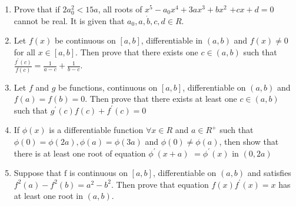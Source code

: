 \begin{enumerate}
    \item Prove that if $2 a_0^2<15 a$, all roots of $x^5-a_0 x^4+3 a x^3+b x^2$ $+c x+d=0$ cannot be real. It is given that $a_0, a, \dot{b}, c, d \in R$.
\item Let $f(x)$ be continuous on $[a, b]$, differentiable in $(a, b)$ and $f(x) \neq 0$ for all $x \in[a, b]$. Then prove that there exists one $c \in(a, b)$ such that $\frac{f^{\prime}(c)}{f(c)}=\frac{1}{a-c}+\frac{1}{b-c}$.

\item  Let $f$ and $g$ be functions, continuous on $[a, b]$, differentiable on $(a, b)$ and $f(a)=f(b)=0$. Then prove that there exists at least one $c \in(a, b)$ such that $g^{\prime}(c) f(c)+f^{\prime}(c)=0$
\item  If $\phi(x)$ is a differentiable function $\forall x \in R$ and $a \in R^{+}$ such that $\phi(0)=\phi(2 a), \phi(a)=\phi(3 a)$ and $\phi(0) \neq \phi(a)$, then show that there is at least one root of equation $\phi^{\prime}(x+a)$ $=\phi^{\prime}(x)$ in $(0,2 a)$
\item  Suppose that $\mathrm{f}$ is continuous on $[a, b]$, differentiable on $(a, b)$ and satisfies $f^2(a)-f^2(b)=a^2-b^2$. Then prove that equation $f(x) f^{\prime}(x)=x$ has at least one root in $(a, b)$.
\end{enumerate}


